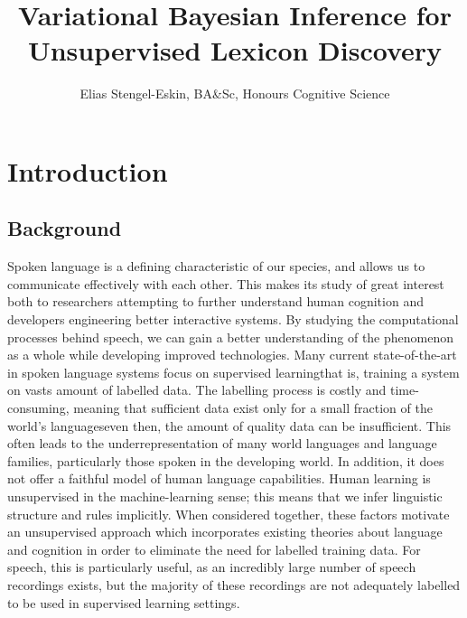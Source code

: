 \documentclass[12pt,letterpaper]{article}
\title{\vspace{-1.5cm} Variational Bayesian Inference for Unsupervised Lexicon Discovery}
\author{Elias Stengel-Eskin, BA\&Sc, Honours Cognitive Science}
\begin{document}
\maketitle
\section{Introduction}
\subsection{Background}
Spoken language is a defining characteristic of our species, and allows us to communicate effectively with each other. This makes its study of great interest both to researchers attempting to further understand human cognition and developers engineering better interactive systems. By studying the computational processes behind speech, we can gain a better understanding of the phenomenon as a whole while developing improved technologies. Many current state-of-the-art in spoken language systems focus on supervised learning\textemdash that is, training a system on vasts amount of labelled data. The labelling process is costly and time-consuming, meaning that sufficient data exist only for a small fraction of the world's languages\textemdash even then, the amount of quality data can be insufficient. This often leads to the underrepresentation of many world languages and language families, particularly those spoken in the developing world. In addition, it does not offer a faithful model of human language capabilities. Human learning is unsupervised in the machine-learning sense; this means that we infer linguistic structure and rules implicitly. When considered together, these factors motivate an unsupervised approach which incorporates existing theories about language and cognition in order to eliminate the need for labelled training data. For speech, this is particularly useful, as an incredibly large number of speech recordings exists, but the majority of these recordings are not adequately labelled to be used in supervised learning settings. 
\end{document}
